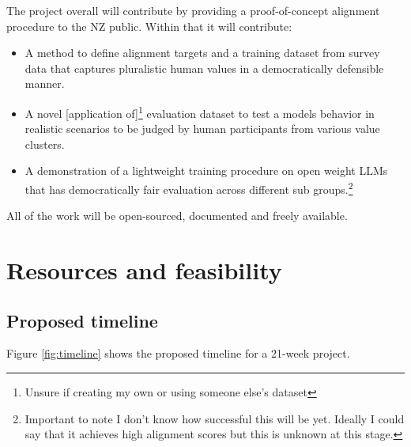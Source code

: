 The project overall will contribute by providing a proof-of-concept alignment procedure to the NZ public. Within that it will contribute:
\begin{itemize}
  \item A method to define alignment targets and a training dataset from survey data that captures pluralistic human values in a democratically defensible manner.
  \item A novel [application of]\footnote{Unsure if creating my own or using someone else's dataset} evaluation dataset to test a models behavior in realistic scenarios to be judged by human participants from various value clusters.
  \item A demonstration of a lightweight training procedure on open weight LLMs that has democratically fair evaluation across different sub groups.\footnote{Important to note I don't know how successful this will be yet. Ideally I could say that it achieves high alignment scores but this is unknown at this stage.}
\end{itemize}

\noindent All of the work will be open-sourced, documented and freely available.

\section{Resources and feasibility}

\subsection{Proposed timeline}

Figure \ref{fig:timeline} shows the proposed timeline for a 21-week project.

